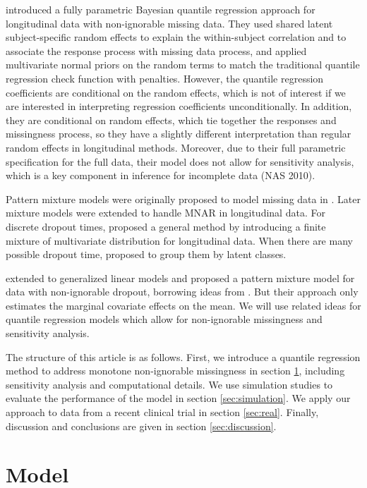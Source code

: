 \documentclass[useAMS,usenatbib,referee]{biom}
\begin{document}
\citet{yuan2010} introduced a fully parametric Bayesian quantile
regression approach for longitudinal data with non-ignorable missing
data. They used shared latent subject-specific random effects to
explain the within-subject correlation and to associate the response
process with missing data process, and applied multivariate normal
priors on the random terms to match the traditional quantile
regression check function with penalties. However, the quantile
regression coefficients are conditional on the random effects, which
is not of interest if we are interested in interpreting regression
coefficients unconditionally.  In addition, they are
conditional on random effects, which tie together the responses and
missingness process, so they have a slightly different interpretation
than regular random effects in longitudinal methods. Moreover, due to
their full parametric specification for the full data, their model
does not allow for sensitivity analysis, which is a key component in
inference for incomplete data (NAS 2010).

Pattern mixture models were originally proposed to model missing data
in \citet{rubin1977}. Later mixture models were extended to handle
MNAR in longitudinal data. For discrete dropout times,
\citet{little1993, little1994} proposed a general method by
introducing a finite mixture of multivariate distribution for
longitudinal data. When there are many possible dropout time,
\citet{roy2003} proposed to group them by latent classes.

\citet{roy2008} extended \citet{roy2003} to generalized linear models
and proposed a pattern mixture model for data with non-ignorable
dropout, borrowing ideas from \citet{heagerty1999}.  But their
approach only estimates the marginal covariate effects on the mean. We
will use related ideas for quantile regression models which allow for
non-ignorable missingness and sensitivity analysis.

The structure of this article is as follows. First, we introduce a
quantile regression method to address monotone non-ignorable
missingness in section \ref{sec:model}, including sensitivity analysis
and computational details.  We use simulation studies to evaluate the
performance of the model in section \ref{sec:simulation}. We apply our
approach to data from a recent clinical trial in section
\ref{sec:real}. Finally, discussion and conclusions are given in
section \ref{sec:discussion}.

\section{Model}
\label{sec:model}
\end{document}
